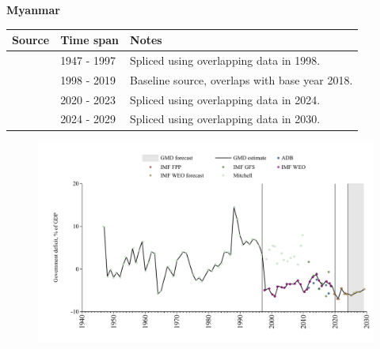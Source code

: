 \documentclass[12pt,a4paper,landscape]{article}
\begin{document}
\begin{adjustbox}{max totalsize={\paperwidth}{\paperheight},center}
\begin{minipage}[t][\textheight][t]{\textwidth}
\vspace*{0.5cm}
{}
\begin{center}
{\Large\bfseries Myanmar}
\end{center}
\vspace{0.5cm}
\begin{table}[H]
\centering
\small
\begin{tabular}{|l|l|l|}
\hline
\textbf{Source} & \textbf{Time span} & \textbf{Notes} \\
\hline
\rowcolor{white}\cite{Mitchell}& 1947 - 1997 &Spliced using overlapping data in 1998.\\
\rowcolor{lightgray}\cite{IMF_WEO}& 1998 - 2019 &Baseline source, overlaps with base year 2018.\\
\rowcolor{white}\cite{IMF_FPP}& 2020 - 2023 &Spliced using overlapping data in 2024.\\
\rowcolor{lightgray}\cite{IMF_WEO_forecast}& 2024 - 2029 &Spliced using overlapping data in 2030.\\
\hline
\end{tabular}
\end{table}
\begin{figure}[H]
\centering
\includegraphics[width=\textwidth,height=0.6\textheight,keepaspectratio]{graphs/MMR_govdef_GDP.pdf}
\end{figure}
\end{minipage}
\end{adjustbox}
\end{document}
